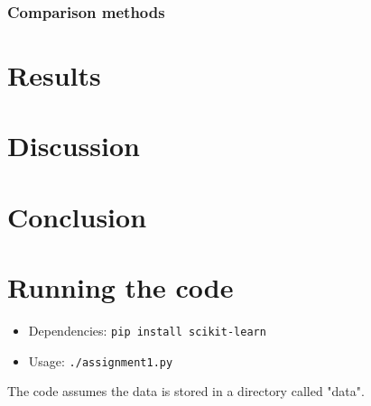\documentclass{article}
\begin{document}
\subsubsection{Comparison methods}

\section{Results}

\section{Discussion}

\section{Conclusion}

\appendix
\section{Running the code}
\begin{itemize}
\item Dependencies: \texttt{pip install scikit-learn}
\item Usage: \texttt{./assignment1.py}
\end{itemize}
The code assumes the data is stored in a directory called "data".
\end{document}
